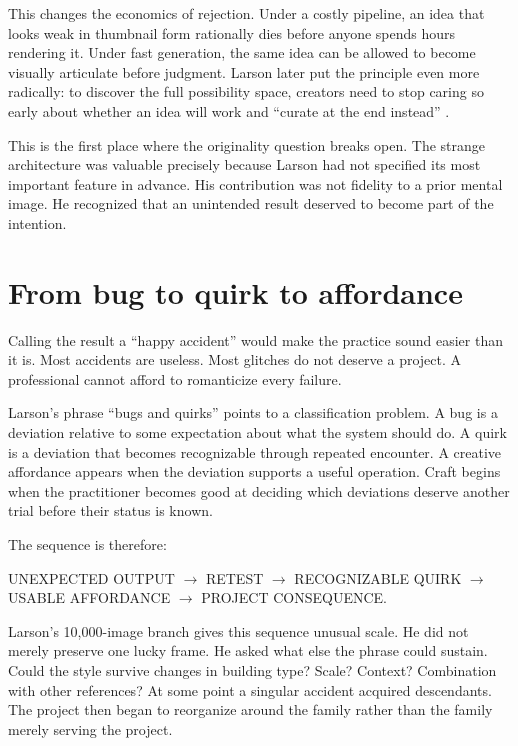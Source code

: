 \documentclass[11pt]{article}
\begin{document}
This changes the economics of rejection. Under a costly pipeline, an idea that looks weak in thumbnail form rationally dies before anyone spends hours rendering it. Under fast generation, the same idea can be allowed to become visually articulate before judgment. Larson later put the principle even more radically: to discover the full possibility space, creators need to stop caring so early about whether an idea will work and ``curate at the end instead'' \cite{AIArtWeeklyLarson2023}.

This is the first place where the originality question breaks open. The strange architecture was valuable precisely because Larson had not specified its most important feature in advance. His contribution was not fidelity to a prior mental image. He recognized that an unintended result deserved to become part of the intention.

\section{From bug to quirk to affordance}
Calling the result a ``happy accident'' would make the practice sound easier than it is. Most accidents are useless. Most glitches do not deserve a project. A professional cannot afford to romanticize every failure.

Larson's phrase ``bugs and quirks'' points to a classification problem. A bug is a deviation relative to some expectation about what the system should do. A quirk is a deviation that becomes recognizable through repeated encounter. A creative affordance appears when the deviation supports a useful operation. Craft begins when the practitioner becomes good at deciding which deviations deserve another trial before their status is known.

The sequence is therefore:

\begin{center}
UNEXPECTED OUTPUT $\rightarrow$ RETEST $\rightarrow$ RECOGNIZABLE QUIRK $\rightarrow$ USABLE AFFORDANCE $\rightarrow$ PROJECT CONSEQUENCE.
\end{center}

Larson's 10,000-image branch gives this sequence unusual scale. He did not merely preserve one lucky frame. He asked what else the phrase could sustain. Could the style survive changes in building type? Scale? Context? Combination with other references? At some point a singular accident acquired descendants. The project then began to reorganize around the family rather than the family merely serving the project.
\end{document}
